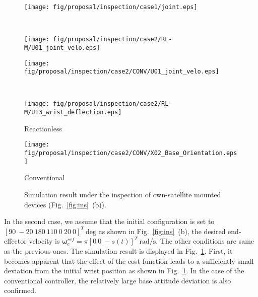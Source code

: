 \documentclass[preprint,12pt]{elsarticle}
\def\fig#1{{Fig.~\ref{fig:#1}}}
\def\unit#1{{~\mathrm{#1}}}
\begin{document}
%
\begin{figure}[t]
  \centering
  \begin{minipage}[h]{0.60\linewidth}
    \centering
    \texttt{[image: fig/proposal/inspection/case1/joint.eps]}
  \end{minipage}\\
  \begin{minipage}[h]{0.40\linewidth}
    \centering
    \texttt{[image: fig/proposal/inspection/case2/RL-M/U01\_joint\_velo.eps]}
  \end{minipage}
  \begin{minipage}[h]{0.40\linewidth}
    \centering
    \texttt{[image: fig/proposal/inspection/case2/CONV/U01\_joint\_velo.eps]}
  \end{minipage}\\
  \vspace{-5mm}
  \begin{minipage}[h]{0.40\linewidth}
    \centering
    \texttt{[image: fig/proposal/inspection/case2/RL-M/U13\_wrist\_deflection.eps]}
    \footnotesize\par{\hspace{8mm}\vspace{-2mm}Reactionless}
  \end{minipage}
  \begin{minipage}[h]{0.40\linewidth}
    \centering
    \texttt{[image: fig/proposal/inspection/case2/CONV/X02\_Base\_Orientation.eps]}
    \footnotesize\par{\hspace{8mm}\vspace{-2mm}Conventional}
  \end{minipage}
  \vspace{1em}
  \caption{Simulation result under the inspection of own-satellite mounted devices (\fig{ins}~(b)).}
  \label{fig:RES_INS2}
\end{figure}
%
In the second case,
we assume that the initial configuration is set to $[90~-20~180~110~0~20~0]^{T}\unit{deg}$ as shown in \fig{ins}~(b),
the desired end-effector velocity is $\bm{\omega}_{e}^{ref} = \pi[0~0~-s(t)]^{T}\unit{rad/s}$.
The other conditions are same as the previous ones.
The simulation result is displayed in \fig{RES_INS2}.
First, it becomes apparent that the effect of the cost function leads to a sufficiently small deviation from
the initial wrist position as shown in \fig{RES_INS2}.
In the case of the conventional controller,
the relatively large base attitude deviation is also confirmed.
\end{document}
